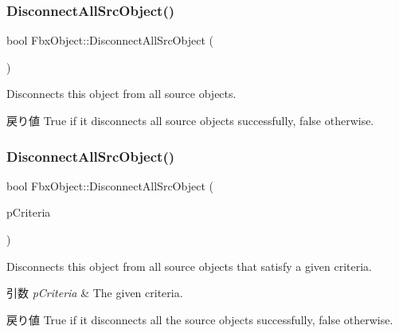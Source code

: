 \subsubsection{\texorpdfstring{Disconnect\+All\+Src\+Object()}{DisconnectAllSrcObject()}\hspace{0.1cm}{\footnotesize\ttfamily [1/4]}}
{\footnotesize\ttfamily bool Fbx\+Object\+::\+Disconnect\+All\+Src\+Object (\begin{DoxyParamCaption}{ }\end{DoxyParamCaption})}

Disconnects this object from all source objects. \begin{DoxyReturn}{戻り値}
{\ttfamily True} if it disconnects all source objects successfully, {\ttfamily false} otherwise. 
\end{DoxyReturn}
\mbox{\label{class_fbx_object_ad6c02944e76b8d6780e734383f872a7d}} 
\subsubsection{\texorpdfstring{Disconnect\+All\+Src\+Object()}{DisconnectAllSrcObject()}\hspace{0.1cm}{\footnotesize\ttfamily [2/4]}}
{\footnotesize\ttfamily bool Fbx\+Object\+::\+Disconnect\+All\+Src\+Object (\begin{DoxyParamCaption}\item[{const \hyperlink{class_fbx_criteria}{Fbx\+Criteria} \&}]{p\+Criteria }\end{DoxyParamCaption})}

Disconnects this object from all source objects that satisfy a given criteria. 
\begin{DoxyParams}{引数}
{\em p\+Criteria} & The given criteria. \\
\hline
\end{DoxyParams}
\begin{DoxyReturn}{戻り値}
{\ttfamily True} if it disconnects all the source objects successfully, {\ttfamily false} otherwise. 
\end{DoxyReturn}
\mbox{\label{class_fbx_object_a17f59548a86067094c17501801e7aa46}} 
